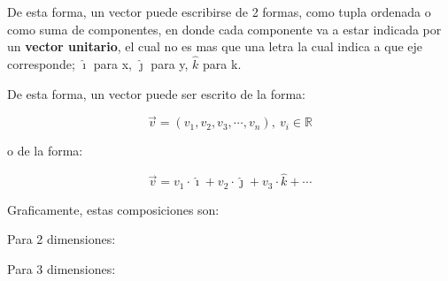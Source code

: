     De esta forma, un vector puede escribirse de 2 formas, como tupla ordenada
    o como suma de componentes, en donde cada componente va a estar indicada
    por un \textbf{vector unitario}, el cual no es mas que una letra la cual
    indica a que eje corresponde; $\hat{\imath}$ para x, $\hat{\jmath}$ para y,
    $\hat{k}$ para k.

    De esta forma, un vector puede ser escrito de la forma:

    $$\vec{v}=(v_1,v_2,v_3,\cdots,v_n),\ v_i \in \mathbb{R}$$


    o de la forma:

    $$\vec{v}=v_1\cdot\hat{\imath}+v_2\cdot\hat{\jmath}+v_3\cdot\hat{k}+\cdots$$

    Graficamente, estas composiciones son:

    Para 2 dimensiones:



    Para 3 dimensiones:


